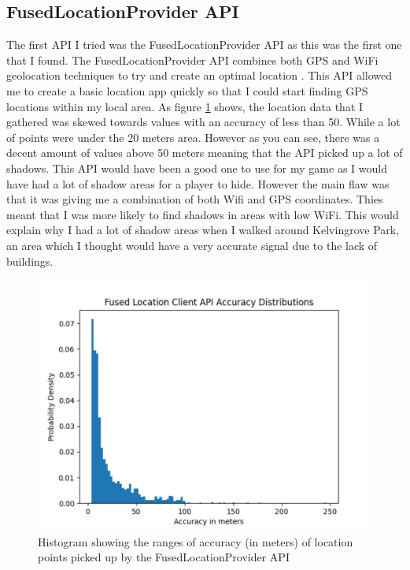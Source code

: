 \documentclass{l4proj}
\begin{document}
\subsection{FusedLocationProvider API}
\label{fusedProvider}
The first API I tried was the FusedLocationProvider API as this was the first one that I found. The FusedLocationProvider API combines both GPS and WiFi geolocation
techniques to try and create an optimal location \citep{fused}. This API allowed me to create a basic location app quickly so that I could start finding GPS locations
within my local area. As figure \ref{fig:fusedhist} shows, the location data that I gathered was skewed towards values with an accuracy of less than 50. While a lot of
points were under the 20 meters area. However as you can see, there was a decent amount of values above 50 meters meaning that the API picked up a lot of shadows.
This API would have been a good one to use for my game as I would have had a lot of shadow areas for a player to hide. However the main flaw was that
it was giving me a combination of both Wifi and GPS coordinates. Thies meant that I was more likely to find shadows in areas with low WiFi. This would
explain why I had a lot of shadow areas when I walked around Kelvingrove Park, an area which I thought would have a very accurate signal due to the lack of buildings.

\begin{figure}
    \centering
    \includegraphics[width=0.6\linewidth]{images/fused_histogram.pdf}    

    \caption{Histogram showing the ranges of accuracy (in meters) of location points picked up by the FusedLocationProvider API}

    \label{fig:fusedhist} 
\end{figure}
\end{document}
